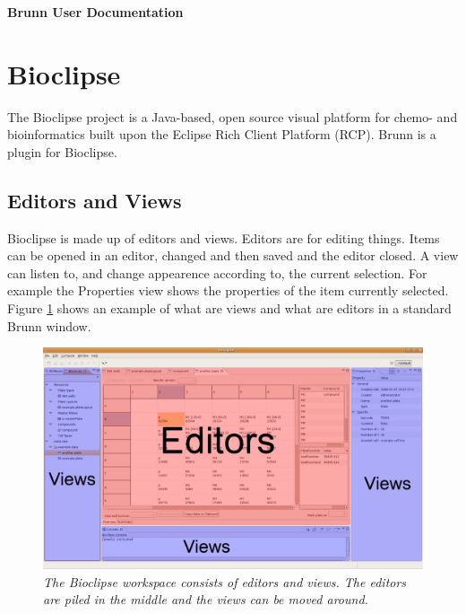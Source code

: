 \documentclass[a4paper,10pt]{article}
\begin{document}
    \huge 
    \noindent
    \textbf{Brunn User Documentation}

    \normalsize

    \section{Bioclipse}
        The Bioclipse project is a Java-based, open source visual platform for
        chemo- and bioinformatics built upon the Eclipse Rich Client Platform
        (RCP). Brunn is a plugin for Bioclipse.

        \subsection{Editors and Views}
            Bioclipse is made up of editors and views. Editors are for editing
            things. Items can be opened in an editor, changed and then saved and
            the editor closed. A view can listen to, and change appearence
            according to, the current selection. For example the Properties view
            shows the properties of the item currently selected. Figure
            \ref{editorsAndViews} shows an example of what are views and what
            are editors in a standard Brunn window.
            
            \begin{figure}[htbp]
                \begin{center}
                    \includegraphics[width=1\textwidth]{images/EditorsViews.png}
                \end{center}
                \caption{\textit{The Bioclipse workspace consists of editors
                                 and views. The editors are piled in the
                                 middle and the views can be moved around.}}
                \label{editorsAndViews}
            \end{figure}
\end{document}
